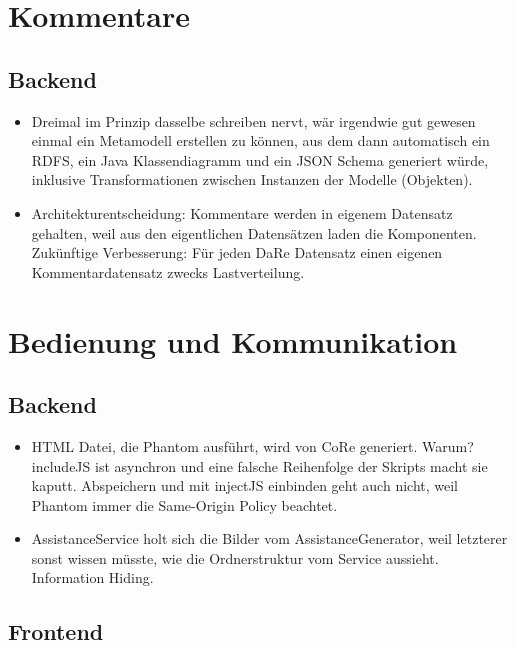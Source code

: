 \documentclass[
	headsepline,
	footsepline,
	fontsize=12pt,
	bibliography=totoc
]{scrbook}
\begin{document}
\section{Kommentare}

\subsection{Backend}

\begin{itemize}
	\item Dreimal im Prinzip dasselbe schreiben nervt, wär irgendwie gut gewesen einmal ein Metamodell erstellen zu können, aus dem dann automatisch ein RDFS, ein Java Klassendiagramm und ein JSON Schema generiert würde, inklusive Transformationen zwischen Instanzen der Modelle (Objekten).
	\item Architekturentscheidung: Kommentare werden in eigenem Datensatz gehalten, weil aus den eigentlichen Datensätzen laden die Komponenten. Zukünftige Verbesserung: Für jeden DaRe Datensatz einen eigenen Kommentardatensatz zwecks Lastverteilung.
\end{itemize}

\section{Bedienung und Kommunikation}

\subsection{Backend}

\begin{itemize}
	\item HTML Datei, die Phantom ausführt, wird von CoRe generiert. Warum? includeJS ist asynchron und eine falsche Reihenfolge der Skripts macht sie kaputt. Abspeichern und mit injectJS einbinden geht auch nicht, weil Phantom immer die Same-Origin Policy beachtet.
	\item AssistanceService holt sich die Bilder vom AssistanceGenerator, weil letzterer sonst wissen müsste, wie die Ordnerstruktur vom Service aussieht. Information Hiding.
\end{itemize}

\subsection{Frontend}
\end{document}
